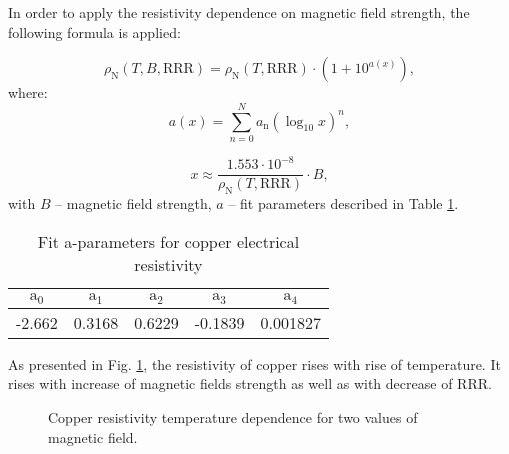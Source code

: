 In order to apply the resistivity dependence on magnetic field strength, the following formula is applied:

\begin{equation}
    \rho_\text{N}(T, B, \text{RRR}) = \rho_\text{N}(T, \text{RRR}) \cdot (1 + 10^{a(x)}),  
\end{equation}
where:
\begin{equation}
    a(x) = \sum_{n=0}^{N} a_\text{n}(\log_\text{10}x)^{n},
\end{equation}

\begin{equation}
    x \approx \frac{1.553 \cdot 10^{-8}}{\rho_\text{N}(T, \text{RRR})} \cdot B,
\end{equation}
with $B$ -- magnetic field strength, $a$ -- fit parameters described in Table \ref{table:nist_resistivity_parameters2}.

\begin{table}[h!]
    \caption{Fit a-parameters for copper electrical resistivity} 
    \vspace{-1.em} 
    \fontsize{10}{10}
    \selectfont 
    \renewcommand{\arraystretch}{1.5}
    \begin{center}
    \begin{tabular}{ ccccc }  
    $\text{a}_0$ & $\text{a}_1$ & $\text{a}_2$ & $\text{a}_3$ & $\text{a}_4$ \\
    \hline
    -2.662 & 0.3168 & 0.6229 & -0.1839 & 0.001827 \\
    \hline
    \end{tabular}
    \end{center}  
     \label{table:nist_resistivity_parameters2} 
 \end{table}

As presented in Fig. \ref{fig:cu_resistivity_plot}, the resistivity of copper rises with rise of temperature. It rises with increase of magnetic fields strength as well as with decrease of RRR.

\begin{figure}[H]
\centering
{}
\caption{Copper resistivity temperature dependence for two values of magnetic field.}
    \label{fig:cu_resistivity_plot}
\end{figure}

